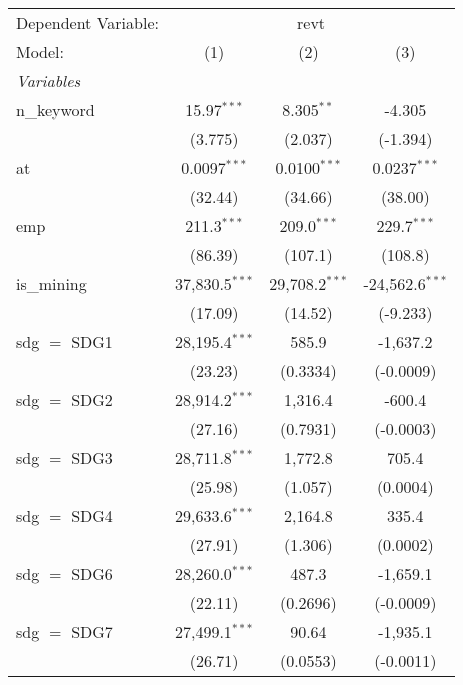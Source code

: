 
\begingroup
\centering
\begin{tabular}{lccc}
   \tabularnewline \midrule \midrule
   Dependent Variable: & \multicolumn{3}{c}{revt}\\
   Model:        & (1)              & (2)              & (3)\\  
   \midrule
   \emph{Variables}\\
   n\_keyword    & 15.97$^{***}$    & 8.305$^{**}$     & -4.305\\   
                 & (3.775)          & (2.037)          & (-1.394)\\   
   at            & 0.0097$^{***}$   & 0.0100$^{***}$   & 0.0237$^{***}$\\   
                 & (32.44)          & (34.66)          & (38.00)\\   
   emp           & 211.3$^{***}$    & 209.0$^{***}$    & 229.7$^{***}$\\   
                 & (86.39)          & (107.1)          & (108.8)\\   
   is\_mining    & 37,830.5$^{***}$ & 29,708.2$^{***}$ & -24,562.6$^{***}$\\   
                 & (17.09)          & (14.52)          & (-9.233)\\   
   sdg $=$ SDG1  & 28,195.4$^{***}$ & 585.9            & -1,637.2\\   
                 & (23.23)          & (0.3334)         & (-0.0009)\\   
   sdg $=$ SDG2  & 28,914.2$^{***}$ & 1,316.4          & -600.4\\   
                 & (27.16)          & (0.7931)         & (-0.0003)\\   
   sdg $=$ SDG3  & 28,711.8$^{***}$ & 1,772.8          & 705.4\\   
                 & (25.98)          & (1.057)          & (0.0004)\\   
   sdg $=$ SDG4  & 29,633.6$^{***}$ & 2,164.8          & 335.4\\   
                 & (27.91)          & (1.306)          & (0.0002)\\   
   sdg $=$ SDG6  & 28,260.0$^{***}$ & 487.3            & -1,659.1\\   
                 & (22.11)          & (0.2696)         & (-0.0009)\\   
   sdg $=$ SDG7  & 27,499.1$^{***}$ & 90.64            & -1,935.1\\   
                 & (26.71)          & (0.0553)         & (-0.0011)\\   

\end{tabular}
